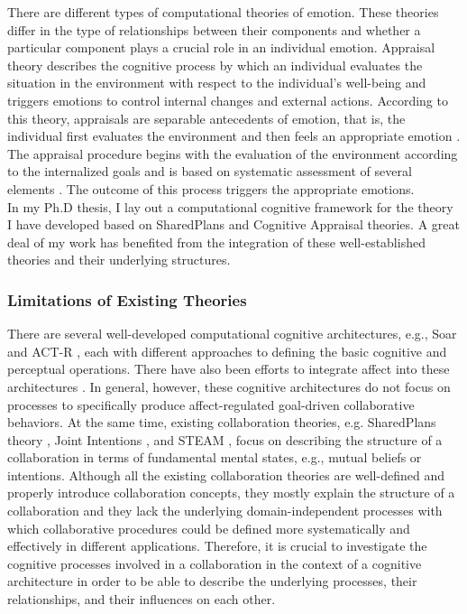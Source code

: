 \documentclass[a4paper, 11pt]{article}
\begin{document}
\begin{small}
There are different types of computational theories of emotion. These theories
differ in the type of relationships between their components and whether a
particular component plays a crucial role in an individual emotion. Appraisal
theory describes the cognitive process by which an individual evaluates the
situation in the environment with respect to the individual's well-being and
triggers emotions to control internal changes and external actions. According to
this theory, appraisals are separable antecedents of emotion, that is, the
individual first evaluates the environment and then feels an appropriate emotion
\cite{scherer:appraisal-processes}. The appraisal procedure begins with the
evaluation of the environment according to the internalized goals and is based
on systematic assessment of several elements
\cite{scherer:sequential-appraisal-process}. The outcome of this process
triggers the appropriate emotions.\\

In my Ph.D thesis, I lay out a computational cognitive framework for the theory
I have developed based on SharedPlans and Cognitive Appraisal theories. A great
deal of my work has benefited from the integration of these well-established
theories and their underlying structures.

\subsubsection*{Limitations of Existing Theories}

There are several well-developed computational cognitive architectures, e.g.,
Soar \cite{laird:soar} and ACT-R \cite{anderson:act-r}, each with different
approaches to defining the basic cognitive and perceptual operations. There have
also been efforts to integrate affect into these architectures
\cite{marinier:behavior-emotion}. In general, however, these cognitive
architectures do not focus on processes to specifically produce affect-regulated
goal-driven collaborative behaviors. At the same time, existing collaboration
theories, e.g. SharedPlans theory \cite{grosz:plans-discourse}, Joint Intentions
\cite{cohen:teamwork}, and STEAM \cite{tambe:flexible-teamwork}, focus on
describing the structure of a collaboration in terms of fundamental mental
states, e.g., mutual beliefs or intentions. Although all the existing
collaboration theories are well-defined and properly introduce collaboration
concepts, they mostly explain the structure of a collaboration and they lack the
underlying domain-independent processes with which collaborative procedures
could be defined more systematically and effectively in different applications.
Therefore, it is crucial to investigate the cognitive processes involved in a
collaboration in the context of a cognitive architecture in order to be able to
describe the underlying processes, their relationships, and their influences on
each other.


\end{small}
\end{document}
